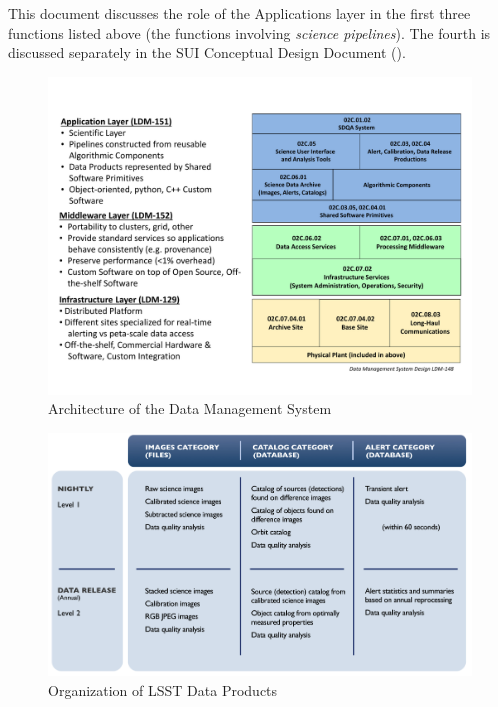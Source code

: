 This document discusses the role of the Applications layer in the first three functions listed above (the functions involving \emph{science pipelines}).  The fourth is discussed separately in the SUI Conceptual Design Document (\SUI).

\begin{figure}
\centering
\includegraphics[angle=90,scale=0.70]{figures/DMS-Architecture.pdf}
\caption{Architecture of the Data Management System\label{fig:DMS}}
\end{figure}
\nocite{LDM-152,LDM-129,LDM-148}

\begin{figure}
\centering
\includegraphics[angle=90]{figures/DataProductDelivarables.png}
\caption{Organization of LSST Data Products\label{fig:DP}}
\end{figure}

